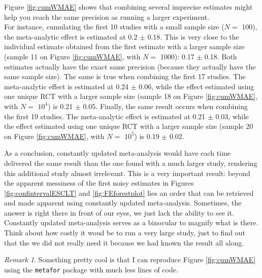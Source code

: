 \documentclass[
]{book}
\theoremstyle{definition}
\theoremstyle{definition}
\theoremstyle{definition}
\theoremstyle{definition}
\theoremstyle{remark}
\newtheorem*{remark}{Remark}
\begin{document}
Figure \ref{fig:cumWMAE} shows that combining several imprecise estimates might help you reach the same precision as running a larger experiment.\\
For instance, cumulating the first 10 studies with a small sample size (\(N=\) 100), the meta-analytic effect is estimated at 0.2 \(\pm\) 0.18.
This is very close to the individual estimate obtained from the first estimate with a larger sample size (sample 11 on Figure \ref{fig:cumWMAE}, with \(N=\) 1000): 0.17 \(\pm\) 0.18.
Both estimates actually have the exact same precision (because they actually have the same sample size).
The same is true when combining the first 17 studies.
The meta-analytic effect is estimated at 0.24 \(\pm\) 0.06, while the effect estimated using one unique RCT with a larger sample size (sample 18 on Figure \ref{fig:cumWMAE}, with \(N=\) \ensuremath{10^{4}}) is 0.21 \(\pm\) 0.05.
Finally, the same result occurs when combining the first 19 studies.
The meta-analytic effect is estimated at 0.21 \(\pm\) 0.03, while the effect estimated using one unique RCT with a larger sample size (sample 20 on Figure \ref{fig:cumWMAE}, with \(N=\) \ensuremath{10^{5}}) is 0.19 \(\pm\) 0.02.

As a conclusion, constantly updated meta-analysis would have each time delivered the same result than the one found with a much larger study, rendering this additional study almost irrelevant.
This is a very important result: beyond the apparent messiness of the first noisy estimates in Figures \ref{fig:confintervalESCLT} and \ref{fig:FEforestplot} lies an order that can be retrieved and made apparent using constantly updated meta-analysis.
Sometimes, the answer is right there in front of our eyes, we just lack the ability to see it.
Constantly updated meta-analysis serves as a binocular to magnify what is there.
Think about how costly it woud be to run a very large study, just to find out that the we did not really need it because we had known the result all along.

\begin{remark}
\iffalse{} {Remark. } \fi{}Something pretty cool is that I can reproduce Figure \ref{fig:cumWMAE} using the \texttt{metafor} package with much less lines of code.
\end{remark}
\end{document}
